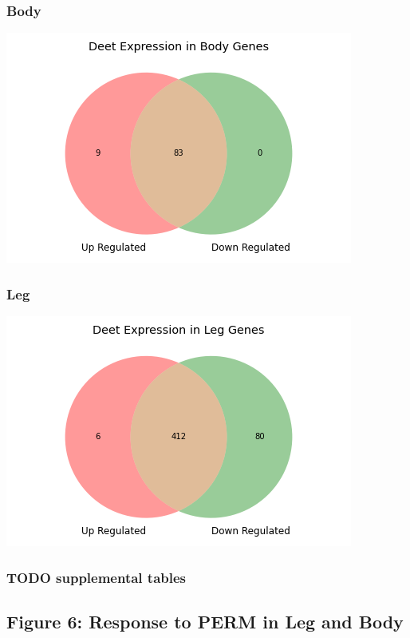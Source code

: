 \documentclass[11pt]{article}
\begin{document}
\subsubsection{Body}
\label{sec:orgdfd6335}
\begin{center}
\includegraphics[width=.9\linewidth]{figure5/DeetBodyDeseq.png}
\end{center}
\subsubsection{Leg}
\label{sec:org5cb2400}
\begin{center}
\includegraphics[width=.9\linewidth]{figure5/DeetLegDeseq.png}
\end{center}
\subsubsection{{\bfseries\sffamily TODO} supplemental tables}
\label{sec:orgcd02d67}
\subsection{Figure 6: Response to PERM in Leg and Body}
\label{sec:orga8451c9}
\end{document}
